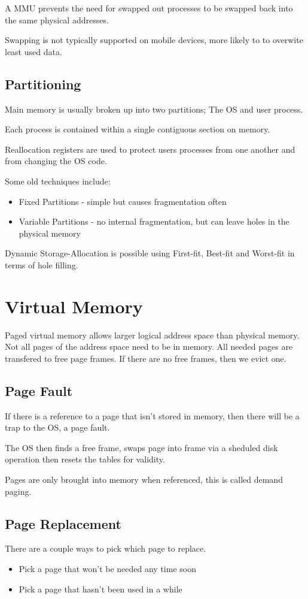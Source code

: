 \documentclass[a4]{article}
\begin{document}
A MMU prevents the need for swapped out processes to be swapped back into the same physical addresses.

Swapping is not typically supported on mobile devices, more likely to to overwite least used data.


\subsection{Partitioning}
Main memory is usually broken up into two partitions; The OS and user process.

Each process is contained within a single contiguous section on memory.

Reallocation registers are used to protect users processes from one another and from changing the OS code.

Some old techniques include:
\begin{itemize}
    \item Fixed Partitions - simple but causes fragmentation often
    \item Variable Partitions - no internal fragmentation, but can leave holes in the physical memory
\end{itemize}

Dynamic Storage-Allocation is possible using First-fit, Best-fit and Worst-fit in terms of hole filling.

\section{Virtual Memory}
Paged virtual memory allows larger logical address space than physical memory.
Not all pages of the address space need to be in memory. All needed pages are transfered to free page frames.
If there are no free frames, then we evict one.

\subsection{Page Fault}
If there is a reference to a page that isn't stored in memory, then there will be a trap to the OS, a page fault.

The OS then finds a free frame, swaps page into frame via a sheduled disk operation then resets the tables for validity.

Pages are only brought into memory when referenced, this is called demand paging.

\subsection{Page Replacement}
There are a couple ways to pick which page to replace.
\begin{itemize}
    \item Pick a page that won't be needed any time soon
    \item Pick a page that hasn't been used in a while
\end{itemize}
\end{document}

